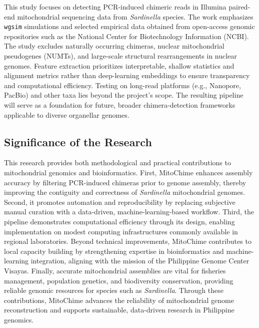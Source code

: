 This study focuses on detecting PCR-induced chimeric reads in Illumina paired-end mitochondrial sequencing data from \textit{Sardinella} species. The work emphasizes \texttt{wgsim} simulations and selected empirical data obtained from open-access genomic repositories such as the National Center for Biotechnology Information (NCBI). The study excludes naturally occurring chimeras, nuclear mitochondrial pseudogenes (NUMTs), and large-scale structural rearrangements in nuclear genomes. Feature extraction prioritizes interpretable, shallow statistics and alignment metrics rather than deep-learning embeddings to ensure transparency and computational efficiency. Testing on long-read platforms (e.g., Nanopore, PacBio) and other taxa lies beyond the project’s scope. The resulting pipeline will serve as a foundation for future, broader chimera-detection frameworks applicable to diverse organellar genomes.

\subsection{Significance of the Research}\label{sec:significance}

This research provides both methodological and practical contributions to mitochondrial genomics and bioinformatics. First, MitoChime enhances assembly accuracy by filtering PCR-induced chimeras prior to genome assembly, thereby improving the contiguity and correctness of \textit{Sardinella} mitochondrial genomes. Second, it promotes automation and reproducibility by replacing subjective manual curation with a data-driven, machine-learning-based workflow. Third, the pipeline demonstrates computational efficiency through its design, enabling implementation on modest computing infrastructures commonly available in regional laboratories. Beyond technical improvements, MitoChime contributes to local capacity building by strengthening expertise in bioinformatics and machine-learning integration, aligning with the mission of the Philippine Genome Center Visayas. Finally, accurate mitochondrial assemblies are vital for fisheries management, population genetics, and biodiversity conservation, providing reliable genomic resources for species such as \textit{Sardinella}. Through these contributions, MitoChime advances the reliability of mitochondrial genome reconstruction and supports sustainable, data-driven research in Philippine genomics.